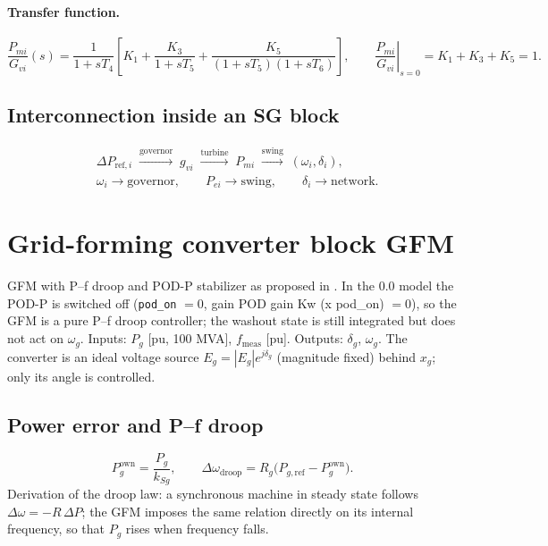 \documentclass[11pt,a4paper]{article}
\numberwithin{equation}{section}
\newcommand{\blk}[1]{\textsf{#1}}
\begin{document}
\paragraph{Transfer function.}
\begin{equation}
\frac{P_{mi}}{G_{vi}}(s) = \frac{1}{1+sT_4}\left[K_1 + \frac{K_3}{1+sT_5} + \frac{K_5}{(1+sT_5)(1+sT_6)}\right],
\qquad
\left.\frac{P_{mi}}{G_{vi}}\right|_{s=0} = K_1+K_3+K_5 = 1 .
\end{equation}

\subsection{Interconnection inside an SG block}
\begin{align}
&\Delta P_{\text{ref},i}\;\xrightarrow{\text{governor}}\; g_{vi}\;\xrightarrow{\text{turbine}}\;P_{mi}\;\xrightarrow{\text{swing}}\;(\omega_i,\delta_i),\\
&\omega_i\to\text{governor},\qquad P_{ei}\to\text{swing},\qquad \delta_i\to\text{network}.
\end{align}

\section{Grid-forming converter block \blk{GFM}}
%
\noindent GFM with P--f droop and POD-P stabilizer as proposed in \cite{RA2021access,RA2023chapter}. In the 0.0 model the POD-P is switched off (\texttt{pod\_on} $=0$, gain \blk{POD gain Kw (x pod\_on)} $=0$), so the GFM is a pure P--f droop controller; the washout state is still integrated but does not act on $\omega_g$.
Inputs: $P_g$ [pu, 100 MVA], $f_{\text{meas}}$ [pu]. Outputs: $\delta_g$, $\omega_g$.
The converter is an ideal voltage source $E_g = |E_g|e^{j\delta_g}$ (magnitude fixed) behind $x_g$; only its angle is controlled.

\subsection{Power error and P--f droop}
\begin{equation}
P_g^{\text{own}} = \frac{P_g}{k_{Sg}},\qquad
\Delta\omega_{\text{droop}} = R_g\big(P_{g,\text{ref}} - P_g^{\text{own}}\big).
\end{equation}
Derivation of the droop law: a synchronous machine in steady state follows $\Delta\omega = -R\,\Delta P$; the GFM imposes the same relation directly on its internal frequency, so that $P_g$ rises when frequency falls.
\end{document}
